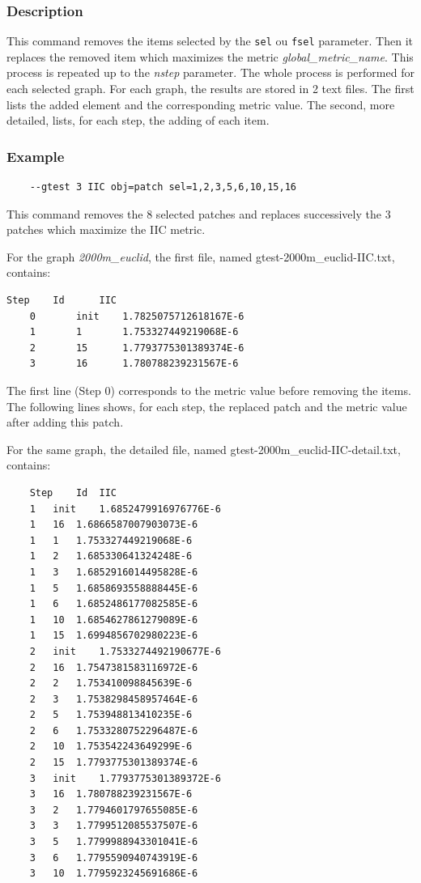 \documentclass[a4paper,10pt]{report}
\begin{document}
\subsubsection{Description}
This command removes the items selected by the \verb|sel| ou \verb|fsel| parameter. Then it replaces the removed item which maximizes the metric \textit{global\_metric\_name}. This process is repeated up to the \textit{nstep} parameter. 
The whole process is performed for each selected graph. For each graph, the results are stored in 2 text files. The first lists the added element and the corresponding metric value. The second, more detailed, lists, for each step, the adding of each item.

\subsubsection{Example}

\begin{Verbatim}
	--gtest 3 IIC obj=patch sel=1,2,3,5,6,10,15,16
\end{Verbatim}
This command removes the 8 selected patches and replaces successively the 3 patches which maximize the IIC metric.

For the graph \textit{2000m\_euclid}, the first file, named gtest-2000m\_euclid-IIC.txt, contains:
\begin{Verbatim}[tabsize=4]
	Step	Id		IIC
	0		init	1.7825075712618167E-6
	1		1		1.753327449219068E-6
	2		15		1.7793775301389374E-6
	3		16		1.780788239231567E-6
\end{Verbatim}
The first line (Step 0) corresponds to the metric value before removing the items. The following lines shows, for each step, the replaced patch and the metric value after adding this patch.

For the same graph, the detailed file, named gtest-2000m\_euclid-IIC-detail.txt, contains:
\begin{Verbatim}
	Step	Id	IIC
	1	init	1.6852479916976776E-6
	1	16	1.6866587007903073E-6
	1	1	1.753327449219068E-6
	1	2	1.685330641324248E-6
	1	3	1.6852916014495828E-6
	1	5	1.6858693558888445E-6
	1	6	1.6852486177082585E-6
	1	10	1.6854627861279089E-6
	1	15	1.6994856702980223E-6
	2	init	1.7533274492190677E-6
	2	16	1.7547381583116972E-6
	2	2	1.753410098845639E-6
	2	3	1.7538298458957464E-6
	2	5	1.753948813410235E-6
	2	6	1.7533280752296487E-6
	2	10	1.753542243649299E-6
	2	15	1.7793775301389374E-6
	3	init	1.7793775301389372E-6
	3	16	1.780788239231567E-6
	3	2	1.7794601797655085E-6
	3	3	1.7799512085537507E-6
	3	5	1.7799988943301041E-6
	3	6	1.7795590940743919E-6
	3	10	1.7795923245691686E-6
\end{Verbatim}
\end{document}
